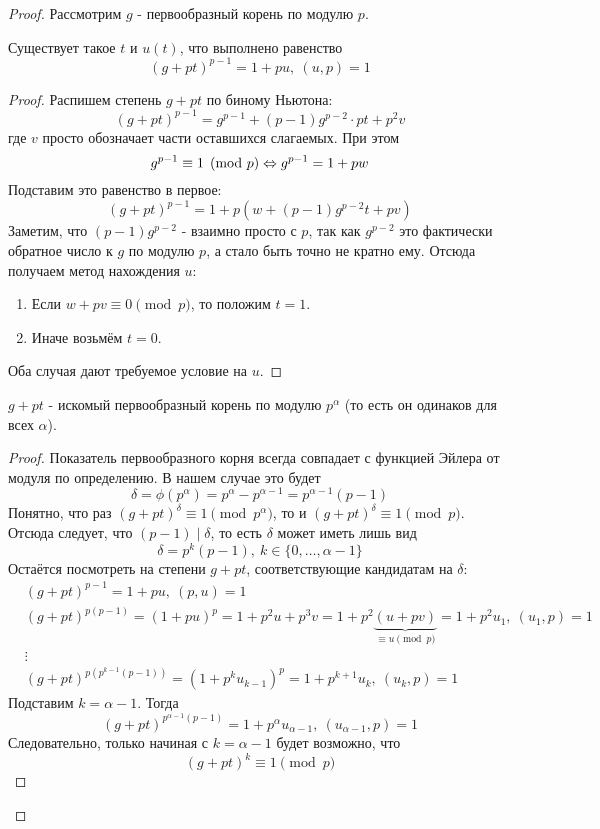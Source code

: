 \begin{proof}
	Рассмотрим $g$ - первообразный корень по модулю $p$.
	
	\begin{lemma}
		Существует такое $t$ и $u(t)$, что выполнено равенство
		\[
			(g + pt)^{p - 1} = 1 + pu,\ (u, p) = 1
		\]
	\end{lemma}

	\begin{proof}
		Распишем степень $g + pt$ по биному Ньютона:
		\[
			(g + pt)^{p - 1} = g^{p - 1} + (p - 1)g^{p - 2} \cdot pt + p^2 v
		\]
		где $v$ просто обозначает части оставшихся слагаемых. При этом
		\[
			g^{p - 1} \equiv 1 \pmod p \Leftrightarrow g^{p - 1} = 1 + pw
		\]
		Подставим это равенство в первое:
		\[
			(g + pt)^{p - 1} = 1 + p(w + (p - 1)g^{p - 2}t + pv)
		\]
		Заметим, что $(p - 1)g^{p - 2}$ - взаимно просто с $p$, так как $g^{p - 2}$ это фактически обратное число к $g$ по модулю $p$, а стало быть точно не кратно ему. Отсюда получаем метод нахождения $u$:
		\begin{enumerate}
			\item Если $w + pv \equiv 0 \pmod p$, то положим $t = 1$.
			\item Иначе возьмём $t = 0$.
		\end{enumerate}
		Оба случая дают требуемое условие на $u$.
	\end{proof}

	\begin{proposition}
		$g + pt$ - искомый первообразный корень по модулю $p^\alpha$ (то есть он одинаков для всех $\alpha$).
	\end{proposition}

	\begin{proof}
		Показатель первообразного корня всегда совпадает с функцией Эйлера от модуля по определению. В нашем случае это будет
		\[
			\delta = \phi(p^\alpha) = p^\alpha - p^{\alpha - 1} = p^{\alpha - 1}(p - 1)
		\]
		Понятно, что раз $(g + pt)^\delta \equiv 1 \pmod {p^\alpha}$, то и $(g + pt)^\delta \equiv 1 \pmod p$. Отсюда следует, что $(p - 1) \mid \delta$, то есть $\delta$ может иметь лишь вид
		\[
			\delta = p^k (p - 1),\ k \in \{0, \ldots, \alpha - 1\}
		\]
		Остаётся посмотреть на степени $g + pt$, соответствующие кандидатам на $\delta$:
		\begin{align*}
			&{(g + pt)^{p - 1} = 1 + pu,\ (p, u) = 1}
			\\
			&{(g + pt)^{p(p - 1)} = (1 + pu)^p = 1 + p^2u + p^3v = 1 + p^2\underbrace{(u + pv)}_{\equiv u \pmod p} = 1 + p^2u_1,\ (u_1, p) = 1}
			\\
			&{\vdots}
			\\
			&{(g + pt)^{p(p^{k - 1}(p - 1))} = (1 + p^k u_{k - 1})^p = 1 + p^{k + 1}u_k,\ (u_k, p) = 1}
		\end{align*}
		Подставим $k = \alpha - 1$. Тогда
		\[
			(g + pt)^{p^{\alpha - 1}(p - 1)} = 1 + p^\alpha u_{\alpha - 1},\ (u_{\alpha - 1}, p) = 1
		\]
		Следовательно, только начиная с $k = \alpha - 1$ будет возможно, что
		\[
			(g + pt)^k \equiv 1 \pmod p
		\]
	\end{proof}
\end{proof}


